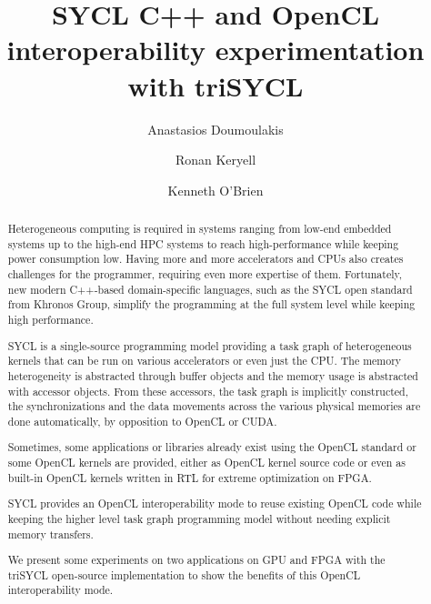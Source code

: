 \documentclass[sigplan]{acmart}
\begin{document}
\title{SYCL C++ and OpenCL interoperability experimentation with
  triSYCL}

\author{Anastasios Doumoulakis}

\author{Ronan Keryell}

\author{Kenneth O'Brien}



\begin{abstract}
  Heterogeneous computing is required in systems ranging from low-end
  embedded systems up to the high-end HPC systems to reach
  high-performance while keeping power consumption low. Having more
  and more accelerators and CPUs also creates challenges for the
  programmer, requiring even more expertise of them. Fortunately, new
  modern C++-based domain-specific languages, such as the SYCL open
  standard from Khronos Group, simplify the programming at the full
  system level while keeping high performance.

  SYCL is a single-source programming model providing a task graph of
  heterogeneous kernels that can be run on various accelerators or
  even just the CPU. The memory heterogeneity is abstracted through
  buffer objects and the memory usage is abstracted with accessor
  objects. From these accessors, the task graph is implicitly
  constructed, the synchronizations and the data movements across the
  various physical memories are done automatically, by opposition to
  OpenCL or CUDA.

  Sometimes, some applications or libraries already exist using the
  OpenCL standard or some OpenCL kernels are provided, either as
  OpenCL kernel source code or even as built-in OpenCL kernels written
  in RTL for extreme optimization on FPGA.

  SYCL provides an OpenCL interoperability mode to reuse existing
  OpenCL code while keeping the higher level task graph programming
  model without needing explicit memory transfers.

  We present some experiments on two applications on GPU and FPGA with
  the triSYCL open-source implementation to show the benefits of this
  OpenCL interoperability mode.
\end{abstract}
\end{document}
